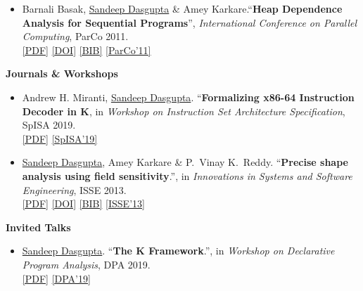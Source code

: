 \documentclass[9pt]{article}
\newenvironment{changemargin}[2]{%
  \begin{list}{}{%
    \setlength{\topsep}{0pt}%
    \setlength{\leftmargin}{#1}%
    \setlength{\rightmargin}{#2}%
    \setlength{\listparindent}{\parindent}%
    \setlength{\itemindent}{\parindent}%
    \setlength{\parsep}{\parskip}%
  }%
  \item[]}{\end{list}
}
\newenvironment{body} {
	\vspace*{-16pt}
	\begin{changemargin}{-0.25in}{-0.5in}
  }	
	{\end{changemargin}
}
\begin{document}
\begin{body}
\begin{itemize}
		\item Barnali Basak, \underline{Sandeep Dasgupta} \& Amey Karkare.``\textbf{Heap Dependence Analysis for Sequential Programs}'', \emph{International Conference on Parallel Computing}, ParCo 2011. \\ 
                \href{http://webhost.engr.illinois.edu/~sdasgup3/Document/parco_2011.pdf}{[PDF]}
                \href{http://dx.doi.org/10.3233/978-1-61499-041-3-99}{[DOI]}
                \href{http://webhost.engr.illinois.edu/~sdasgup3/Document/parco_2011.bib}{[BIB]}
                \href{http://parco2011.elis.ugent.be/}{[ParCo'11]}
	\end{itemize}

\textbf{Journals \& Workshops}\\
\vspace{-4pt}
\begin{itemize} \itemsep -0pt
     \item  Andrew H. Miranti, \underline{Sandeep Dasgupta}. ``\textbf{Formalizing x86-64 Instruction Decoder in K}, in \emph{Workshop on Instruction Set Architecture Specification}, SpISA 2019. \\
     \href{http://webhost.engr.illinois.edu/~sdasgup3/Document/spisa_2019.pdf}{[PDF]}
     \href{https://www.cl.cam.ac.uk/~jrh13/spisa19.html}{[SpISA'19]}

    \item \underline{Sandeep Dasgupta}, Amey Karkare \& P.\ Vinay K.\ Reddy. ``\textbf{Precise shape analysis using field sensitivity}.'', in \emph{Innovations in Systems and Software Engineering}, ISSE 2013. \\
    \href{http://webhost.engr.illinois.edu/~sdasgup3/Document/isse_2013.pdf}{[PDF]}
    \href{http://www.springerlink.com/openurl.asp?genre=article&id=doi:10.1007/s11334-013-0198-7}{[DOI]}
    \href{http://webhost.engr.illinois.edu/~sdasgup3/Document/isse_2013.bib}{[BIB]}
    \href{https://link.springer.com/journal/11334}{[ISSE'13]}
\end{itemize}

\textbf{Invited Talks}\\
\vspace{-4pt}
\begin{itemize} \itemsep -0pt
    \item  \underline{Sandeep Dasgupta}. ``\textbf{The K Framework}.'', in \emph{Workshop on Declarative Program Analysis}, DPA 2019. \\
    \href{http://webhost.engr.illinois.edu/~sdasgup3/Document/dpa_2019.pdf}{[PDF]}
    \href{https://pldi19.sigplan.org/details/dpa-2019-papers/5/The-K-Framework}{[DPA'19]}
\end{itemize}


\end{body}
\end{document}
